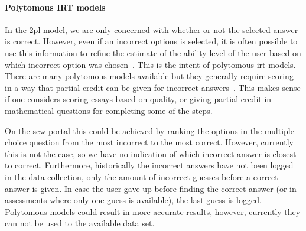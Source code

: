 \paragraph{Polytomous IRT models}
In the \gls{2pl} model, we are only concerned with whether or not the selected answer is correct.
However, even if an incorrect options is selected, it is often possible to use this information to refine the estimate of the ability level of the user based on which incorrect option was chosen~\cite{magis2017computerized}.
This is the intent of polytomous \gls{irt} models.
There are many polytomous models available but they generally require scoring in a way that partial credit can be given for incorrect answers~\cite{dodd1995computerized}.
This makes sense if one considers scoring essays based on quality, or giving partial credit in mathematical questions for completing some of the steps.

On the \gls{scw} portal this could be achieved by ranking the options in the multiple choice question from the most incorrect to the most correct.
However, currently this is not the case, so we have no indication of which incorrect answer is closest to correct.
Furthermore, historically the incorrect answers have not been logged in the data collection, only the amount of incorrect guesses before a correct answer is given.
In case the user gave up before finding the correct answer (or in assessments where only one guess is available), the last guess is logged.
Polytomous models could result in more accurate results, however, currently they can not be used to the available data set.

